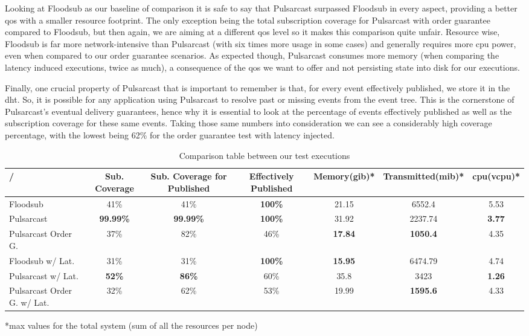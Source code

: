 Looking at Floodsub as our baseline of comparison it is safe to say that
Pulsarcast surpassed Floodsub in every aspect, providing a better
\acrshort{qos} with a smaller resource footprint.  The only exception being the
total subscription coverage for Pulsarcast with order guarantee compared to
Floodsub, but then again, we are aiming at a different \acrshort{qos} level so
it makes this comparison quite unfair.  Resource wise, Floodsub is far more
network-intensive than Pulsarcast (with six times more usage in some cases) and
generally requires more \acrshort{cpu} power, even when compared to our order
guarantee scenarios. As expected though, Pulsarcast consumes more memory (when
comparing the latency induced executions, twice as much), a consequence  of the
\acrshort{qos} we want to offer and not persisting state into disk for our
executions.

Finally, one crucial property of Pulsarcast that is important to remember is
that, for every event effectively published, we store it in the \acrshort{dht}.
So, it is possible for any application using Pulsarcast to resolve past or
missing events from the event tree. This is the cornerstone of Pulsarcast's
eventual delivery guarantees, hence why it is essential to look at the
percentage of events effectively published as well as the subscription coverage
for these same events. Taking those same numbers into consideration we can see
a considerably high coverage percentage, with the lowest being 62\% for the
order guarantee test with latency injected.

\begin{table}
\caption{Comparison table between our test executions}
\label{table:evaluation-comparison}
  \begin{center}
   \begin{tabular}{|l| c c c c c c|} 
   \hline
   / & Sub. Coverage &  Sub. Coverage for Published & Effectively Published &
   Memory(\acrshort{gib})* & Transmitted(\acrshort{mib})* & \acrshort{cpu}(\acrshort{vcpu})* \\ [0.5ex] 
   \hline\hline
   Floodsub & 41\% & 41\% & \textbf{100\%} & 21.15 & 6552.4 & 5.53 \\
   Pulsarcast & \textbf{99.99\%} & \textbf{99.99\%} &  \textbf{100\%} & 31.92 & 2237.74 & \textbf{3.77} \\
   Pulsarcast Order G. & 37\% & 82\% & 46\% & \textbf{17.84} & \textbf{1050.4} & 4.35 \\
   \hline
   Floodsub w/ Lat. & 31\% & 31\% & \textbf{100\%} & \textbf{15.95} & 6474.79 & 4.74 \\
   Pulsarcast w/ Lat. & \textbf{52\%} & \textbf{86\%} & 60\% & 35.8 & 3423 & \textbf{1.26}\\
   Pulsarcast Order G. w/ Lat. & 32\% & 62\% & 53\% & 19.99 & \textbf{1595.6} & 4.33 \\
   \hline
  \end{tabular}
  \footnotesize{*max values for the total system (sum of all the resources per node)}
  \end{center}
\end{table}
